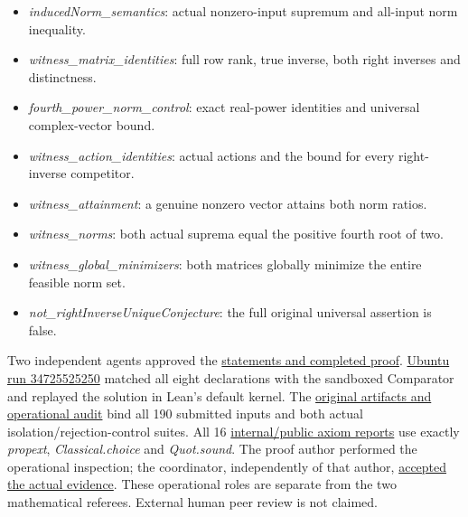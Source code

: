 \documentclass[11pt,a4paper]{article}
\providecommand{\tightlist}{\setlength{\itemsep}{0pt}\setlength{\parskip}{0pt}}
\begin{document}
\begin{itemize}
\tightlist
\item
  \textit{inducedNorm\_semantics}: actual nonzero-input supremum and
  all-input norm inequality.
\item
  \textit{witness\_matrix\_identities}: full row rank, true inverse,
  both right inverses and distinctness.
\item
  \textit{fourth\_power\_norm\_control}: exact real-power identities and
  universal complex-vector bound.
\item
  \textit{witness\_action\_identities}: actual actions and the bound for
  every right-inverse competitor.
\item
  \textit{witness\_attainment}: a genuine nonzero vector attains both
  norm ratios.
\item
  \textit{witness\_norms}: both actual suprema equal the positive fourth
  root of two.
\item
  \textit{witness\_global\_minimizers}: both matrices globally minimize
  the entire feasible norm set.
\item
  \textit{not\_rightInverseUniqueConjecture}: the full original
  universal assertion is false.
\end{itemize}

Two independent agents approved the
\href{https://github.com/ajt60gaibb/OpenProblemsInNLA/blob/main/linear-systems-and-elimination/IE-23/lean/reviews}{statements
and completed proof}.
\href{https://github.com/sgstepaniants/OpenProblemsInNLA/actions/runs/34725525250}{Ubuntu
run 34725525250} matched all eight declarations with the sandboxed
Comparator and replayed the solution in Lean's default kernel. The
\href{https://github.com/ajt60gaibb/OpenProblemsInNLA/blob/main/linear-systems-and-elimination/IE-23/lean/verification/linux-2026-09-12}{original
artifacts and operational audit} bind all 190 submitted inputs and both
actual isolation/rejection-control suites. All 16
\href{https://github.com/ajt60gaibb/OpenProblemsInNLA/blob/main/linear-systems-and-elimination/IE-23/lean/verification/linux-2026-09-12/axiom-verification.json}{internal/public
axiom reports} use exactly \textit{propext}, \textit{Classical.choice}
and \textit{Quot.sound}. The proof author performed the operational
inspection; the coordinator, independently of that author,
\href{https://github.com/ajt60gaibb/OpenProblemsInNLA/blob/main/linear-systems-and-elimination/IE-23/lean/verification/root-operational-2026-09-12/ROOT-CHECKS.json}{accepted
the actual evidence}. These operational roles are separate from the two
mathematical referees. External human peer review is not claimed.
\end{document}

